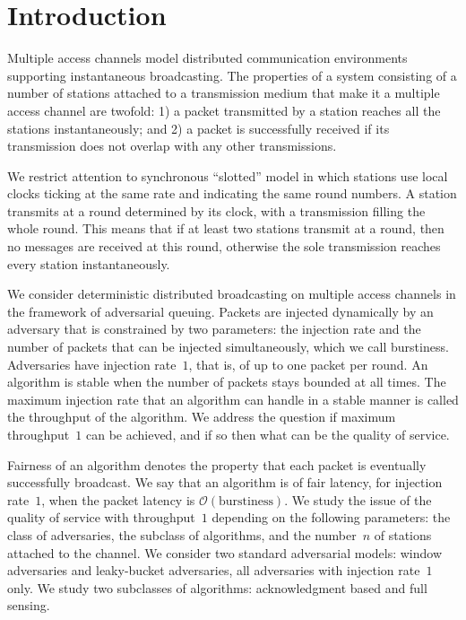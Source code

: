 \documentclass[11pt]{article}
\newcommand{\cO}{\mathcal{O}}
\begin{document}
\newpage

\section{Introduction}

\label{sec:introduction}



Multiple access channels model distributed communication environments supporting instantaneous broadcasting.
The properties of a system consisting of a number of stations attached to a transmission medium that make it a multiple access channel are twofold:
1) a packet transmitted by a station reaches all the stations instantaneously; and
2) a packet is successfully received if its transmission does not overlap with any other transmissions.

We restrict attention to synchronous ``slotted'' model in which stations use local clocks ticking at the same rate and indicating the same round numbers.
A station transmits at a round determined by its clock, with a transmission filling the whole round.
This means that if at least two stations transmit at a round, then no messages are received at this round, otherwise the sole transmission reaches every station instantaneously.


We consider deterministic distributed broadcasting on multiple access channels in the framework of adversarial queuing.
Packets are injected dynamically by an adversary that is constrained by two parameters: the injection rate  and the number of packets that can be injected simultaneously, which we call burstiness.
Adversaries have injection rate~$1$, that is, of up to one packet per round.
An algorithm is stable when the number of packets stays bounded at all times.
The maximum injection rate that an algorithm can handle in a stable manner is called the throughput of the algorithm.
We address the question if maximum throughput~$1$ can be achieved, and if so then what can be the quality of service.

Fairness of an algorithm denotes the property that each packet is eventually successfully broadcast.
We say that an algorithm is of fair latency, for injection rate~$1$, when the packet latency is $\cO(\text{burstiness})$.
We study the issue of the quality of service with throughput~$1$ depending on the following parameters: the class of adversaries, the subclass of algorithms, and the number~$n$ of stations attached to the channel.
We consider two standard adversarial models: window adversaries and leaky-bucket adversaries, all adversaries with injection rate~$1$ only.
We study two subclasses of algorithms: acknowledgment based and full sensing.
\end{document}
